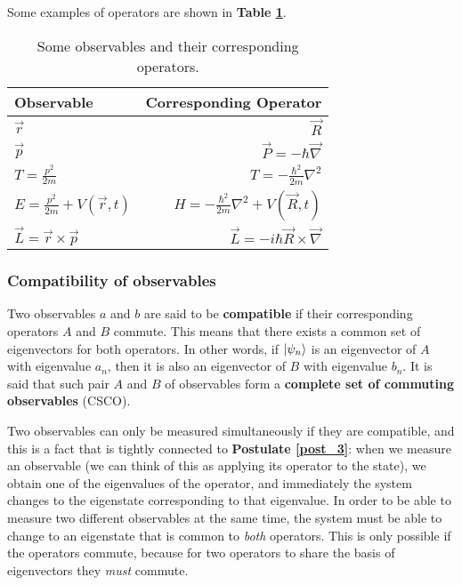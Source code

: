Some examples of operators are shown in \textbf{Table \ref{operators}}.

\begin{table}[htbp] \label{operators}
    \def\arraystretch{1.5}
    \centering
    \begin{tabular}{lr}
        \hline
        \textbf{Observable} & \textbf{Corresponding Operator} \\
        \hline
        $\vec{r}$ & $\vec{R}$ \\
        $\vec{p}$ & $\vec{P} = -\hbar \vec{\nabla}$ \\
        $T = \frac{p^2}{2m}$ & $T = -\frac{\hbar^2}{2m}\nabla^2$ \\
        $E = \frac{p^2}{2m} + V(\vec{r}, t)$ & $H = -\frac{\hbar^2}{2m}\nabla^2 + V(\vec{R}, t)$ \\
        $\vec{L} = \vec{r}\times\vec{p}$ & $\vec{L} = -i\hbar\vec{R}\times\vec{\nabla}$ \\
        \hline
    \end{tabular}
    \caption{Some observables and their corresponding operators.}
\end{table}

\subsubsection{Compatibility of observables}

Two observables $a$ and $b$ are said to be \textbf{compatible} if their corresponding operators $A$ and $B$ commute. This means that there exists a common set of eigenvectors for both operators. In other words, if $\ket{\psi_n}$ is an eigenvector of $A$ with eigenvalue $a_n$, then it is also an eigenvector of $B$ with eigenvalue $b_n$. It is said that such pair $A$ and $B$ of observables form a  \textbf{complete set of commuting observables} (CSCO).

Two observables can only be measured simultaneously if they are compatible, and this is a fact that is tightly connected to \textbf{Postulate \ref{post_3}}: when we measure an observable (we can think of this as applying its operator to the state), we obtain one of the eigenvalues of the operator, and immediately the system changes to the eigenstate corresponding to that eigenvalue. In order to be able to measure two different observables at the same time, the system must be able to change to an eigenstate that is common to \textit{both} operators. This is only possible if the operators commute, because for two operators to share the basis of eigenvectors they \textit{must} commute.


